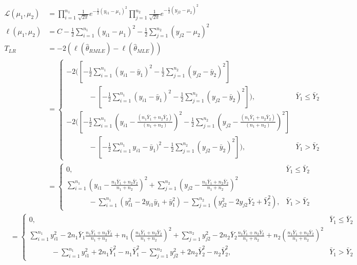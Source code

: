 \documentclass[
  letterpaper,
  DIV=11,
  numbers=noendperiod]{scrreprt}
\begin{document}
\[\begin{aligned}
\mathcal L(\mu_1,\mu_2) &= \prod_{i=1}^{n_1}\frac{1}{\sqrt{2 \pi}} e ^{-\frac 1 2 (y_{i1}- \mu_1)^2}\prod_{j=1}^{n_2}\frac{1}{\sqrt{2 \pi}} e ^{-\frac 1 2 (y_{j2}- \mu_2)^2} \\
\ell(\mu_1,\mu_2) &= C -\frac 1 2\sum_{i=1}^{n_1} (y_{i1}- \mu_1)^2-\frac 1 2\sum_{j=1}^{n_2} (y_{j2}- \mu_2)^2\\
T_{LR} &= -2 (\ell (\hat \theta_{RMLE})-\ell (\hat \theta_{MLE})) \\
&=\begin{cases} -2 \bigg(\left[-\frac 1 2\sum_{i=1}^{n_1} (y_{i1}- \bar y_1)^2-\frac 1 2\sum_{j=1}^{n_2} (y_{j2}- \bar y_2)^2\right] \\
~~~~~~~~~~~~~~-\left[-\frac 1 2\sum_{i=1}^{n_1} (y_{i1}- \bar y_1)^2-\frac 1 2\sum_{j=1}^{n_2} (y_{j2}- \bar y_2)^2\right] \bigg), & \bar Y_1 \leq \bar Y_2\\
-2 \bigg(\left[-\frac 1 2\sum_{i=1}^{n_1} \left(y_{i1}-  \frac{(n_1 \bar Y_1 +n_2 \bar Y _2)}{(n_1+n_2)}\right)^2-\frac 1 2\sum_{j=1}^{n_2} \left(y_{j2}- \frac{(n_1 \bar Y_1 +n_2 \bar Y _2)}{(n_1+n_2)}\right)^2\right]\\
~~~~~~~~~~~~~~-\left[-\frac 1 2\sum_{i=1}^{n_1} y_{i1}- \bar y_1)^2-\frac 1 2\sum_{j=1}^{n_2} (y_{j2}- \bar y_2)^2\right] \bigg) , &\bar Y_1 > \bar Y_2 \end{cases} \\
&=\begin{cases} 0, & \bar Y_1 \leq \bar Y_2\\
\sum_{i=1}^{n_1} \left(y_{i1}-  \frac{n_1 \bar Y_1 +n_2 \bar Y _2}{n_1+n_2}\right)^2+\sum_{j=1}^{n_2} \left(y_{j2}- \frac{n_1 \bar Y_1 +n_2 \bar Y _2}{n_1+n_2}\right)^2\\
~~~~~~~~~~~~~~-\sum_{i=1}^{n_1} (y_{i1}^2- 2 y_{i1}\bar y_1 + \bar y_1^2)-\sum_{j=1}^{n_2} (y_{j2}^2-2y_{j2}\bar Y_2 +\bar Y_2^2) , &\bar Y_1 > \bar Y_2 \end{cases}
\end{aligned}\] \[\begin{aligned}
&=\begin{cases} 0, & \bar Y_1 \leq \bar Y_2\\
\sum_{i=1}^{n_1} y_{i1}^2-  2n_1\bar Y_1 \frac{n_1 \bar Y_1 +n_2 \bar Y _2}{n_1+n_2}+n_1\left(\frac{n_1 \bar Y_1 +n_2 \bar Y _2}{n_1+n_2}\right)^2+\sum_{j=1}^{n_2} y_{j2}^2-2n_2 \bar Y_2 \frac{n_1 \bar Y_1 +n_2 \bar Y _2}{n_1+n_2} + n_2 \left(\frac{n_1 \bar Y_1 +n_2 \bar Y _2}{n_1+n_2}\right)^2\\
~~~~~~~~~~~~~~-\sum_{i=1}^{n_1} y_{i1}^2 + 2 n_1 \bar Y_1^2 - n_1\bar Y_1^2-\sum_{j=1}^{n_2} y_{j2}^2+2n_2\bar Y_2^2 -n_2\bar Y_2^2 , &\bar Y_1 > \bar Y_2 \end{cases} \\

\end{aligned}\]
\end{document}
